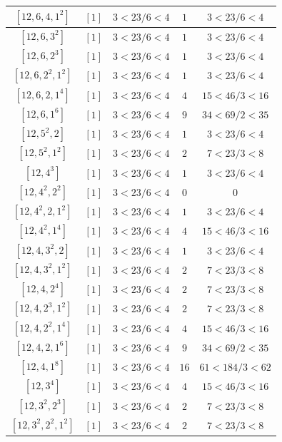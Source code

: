 \documentclass{article}%
\begin{document}
\begin{center}
\begin{longtable}{||c|c|c|c|c||}
$[12, 6, 4, 1^{2}]$ & $[1]$ & $3 < 23/6 < 4$ & $1$ & $3 < 23/6 < 4$ \\ \hline 
$[12, 6, 3^{2}]$ & $[1]$ & $3 < 23/6 < 4$ & $1$ & $3 < 23/6 < 4$ \\ \hline 
$[12, 6, 2^{3}]$ & $[1]$ & $3 < 23/6 < 4$ & $1$ & $3 < 23/6 < 4$ \\ \hline 
$[12, 6, 2^{2}, 1^{2}]$ & $[1]$ & $3 < 23/6 < 4$ & $1$ & $3 < 23/6 < 4$ \\ \hline 
$[12, 6, 2, 1^{4}]$ & $[1]$ & $3 < 23/6 < 4$ & $4$ & $15 < 46/3 < 16$ \\ \hline 
$[12, 6, 1^{6}]$ & $[1]$ & $3 < 23/6 < 4$ & $9$ & $34 < 69/2 < 35$ \\ \hline 
$[12, 5^{2}, 2]$ & $[1]$ & $3 < 23/6 < 4$ & $1$ & $3 < 23/6 < 4$ \\ \hline 
$[12, 5^{2}, 1^{2}]$ & $[1]$ & $3 < 23/6 < 4$ & $2$ & $7 < 23/3 < 8$ \\ \hline 
$[12, 4^{3}]$ & $[1]$ & $3 < 23/6 < 4$ & $1$ & $3 < 23/6 < 4$ \\ \hline 
$[12, 4^{2}, 2^{2}]$ & $[1]$ & $3 < 23/6 < 4$ & $0$ & $0$ \\ \hline 
$[12, 4^{2}, 2, 1^{2}]$ & $[1]$ & $3 < 23/6 < 4$ & $1$ & $3 < 23/6 < 4$ \\ \hline 
$[12, 4^{2}, 1^{4}]$ & $[1]$ & $3 < 23/6 < 4$ & $4$ & $15 < 46/3 < 16$ \\ \hline 
$[12, 4, 3^{2}, 2]$ & $[1]$ & $3 < 23/6 < 4$ & $1$ & $3 < 23/6 < 4$ \\ \hline 
$[12, 4, 3^{2}, 1^{2}]$ & $[1]$ & $3 < 23/6 < 4$ & $2$ & $7 < 23/3 < 8$ \\ \hline 
$[12, 4, 2^{4}]$ & $[1]$ & $3 < 23/6 < 4$ & $2$ & $7 < 23/3 < 8$ \\ \hline 
$[12, 4, 2^{3}, 1^{2}]$ & $[1]$ & $3 < 23/6 < 4$ & $2$ & $7 < 23/3 < 8$ \\ \hline 
$[12, 4, 2^{2}, 1^{4}]$ & $[1]$ & $3 < 23/6 < 4$ & $4$ & $15 < 46/3 < 16$ \\ \hline 
$[12, 4, 2, 1^{6}]$ & $[1]$ & $3 < 23/6 < 4$ & $9$ & $34 < 69/2 < 35$ \\ \hline 
$[12, 4, 1^{8}]$ & $[1]$ & $3 < 23/6 < 4$ & $16$ & $61 < 184/3 < 62$ \\ \hline 
$[12, 3^{4}]$ & $[1]$ & $3 < 23/6 < 4$ & $4$ & $15 < 46/3 < 16$ \\ \hline 
$[12, 3^{2}, 2^{3}]$ & $[1]$ & $3 < 23/6 < 4$ & $2$ & $7 < 23/3 < 8$ \\ \hline 
$[12, 3^{2}, 2^{2}, 1^{2}]$ & $[1]$ & $3 < 23/6 < 4$ & $2$ & $7 < 23/3 < 8$ \\ \hline 

\end{longtable}
\end{center}
\end{document}
